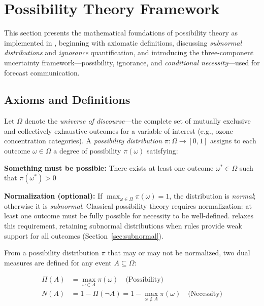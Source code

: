 \section{Possibility Theory Framework}\label{sec:poss_framework}

This section presents the mathematical foundations of possibility theory as implemented in \clyfar{}, beginning with axiomatic definitions, discussing \textit{subnormal distributions} and \textit{ignorance} quantification, and introducing the three-component uncertainty framework---possibility, ignorance, and \textit{conditional necessity}---used for forecast communication.

\subsection{Axioms and Definitions}\label{sec:poss_axioms}
Let $\Omega$ denote the \textit{universe of discourse}---the complete set of mutually exclusive and collectively exhaustive outcomes for a variable of interest (e.g., ozone concentration categories). A \textit{possibility distribution} $\pi: \Omega \to [0,1]$ assigns to each outcome $\omega \in \Omega$ a degree of possibility $\pi(\omega)$ satisfying:

\begin{axiomlist}
\item \textbf{Something must be possible:} There exists at least one outcome $\omega^* \in \Omega$ such that $\pi(\omega^*) > 0$
\item \textbf{Normalization (optional):} If $\max_{\omega \in \Omega} \pi(\omega) = 1$, the distribution is \textit{normal}; otherwise it is \textit{subnormal}. Classical possibility theory \citep{Dubois1988-nh} requires normalization: at least one outcome must be fully possible for necessity to be well-defined. \clyfar{} relaxes this requirement, retaining subnormal distributions when rules provide weak support for all outcomes (Section~\ref{sec:subnormal}).
\end{axiomlist}

From a possibility distribution $\pi$ that may or may not be normalized, two dual measures are defined for any event $A \subseteq \Omega$:

\begin{align}
\Pi(A) &= \max_{\omega \in A} \pi(\omega) \quad \text{(Possibility)} \label{eq:poss} \\
N(A) &= 1 - \Pi(\neg A) = 1 - \max_{\omega \notin A} \pi(\omega) \quad \text{(Necessity)} \label{eq:nec}
\end{align}

